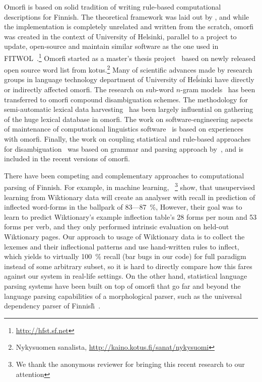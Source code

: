 \documentclass[a4paper,12pt]{article}
\begin{document}
Omorfi is based on solid tradition of writing rule-based computational
descriptions for Finnish. The theoretical framework was laid out by
\citet{koskenniemi1983twolevel}, and while the implementation is completely
unrelated and written from the scratch, omorfi was created in the context of
University of Helsinki, parallel to a project to update, open-source and
maintain similar software as the one used in
FITWOL~\citep{hfst2012}.\footnote{\url{http://hfst.sf.net}} Omorfi started  as
a master's thesis project~\citep{pirinen2008} based on newly released open
source word list from kotus.\footnote{Nykysuomen sanalista,
\url{http://kaino.kotus.fi/sanat/nykysuomi}} Many of scientific advances made
by research groups in language technology department of University of Heĺsinki
have directly or indirectly affected omorfi. The research on sub-word
\(n\)-gram models~\citep{pirinen,} has been transferred to omorfi compound
disambiguation schemes. The methodology for semi-automatic lexical data
harvesting~\citep{linden} has been largely influential on gathering of the huge
lexical database in omorfi. The work on software-engineering aspects of
maintenance of computational linguistics software~\cite{} is based on
experiences with omorfi. Finally, the work on coupling statistical and
rule-based approaches for disambiguation~\citep{} was based on grammar and
parsing approach by~\citet{}, and is included in the recent versions of omorfi.

There have been competing and complementary approaches to computational parsing
of Finnish. For example, in machine learning,
~\citet{durrett2013supervised}\footnote{We thank the anonymous reviewer for
bringing this recent research to our attention} show, that unsupervised
learning from Wiktionary data will create an analyser with recall in prediction
of inflected word-forms in the ballpark of 83---87~\%, However, their goal was
to learn to predict Wiktionary's example inflection table's 28 forms per noun
and 53 forms per verb, and they only performed intrinsic evaluation on held-out
Wiktionary pages. Our approach to usage of Wiktionary data is to collect the
lexemes and their inflectional patterns and use hand-written rules to inflect,
which yields to virtually 100~\% recall (bar bugs in our code) for full
paradigm instead of some arbitrary subset, so it is hard to directly compare
how this fares against our system in real-life settings. On the other hand,
statistical language parsing systems have been built on top of omorfi that go
far and beyond the language parsing capabilities of a morphological parser, such
as the universal dependency parser of Finnish̃~\cite{UDfinnishnodalida}.
\end{document}

